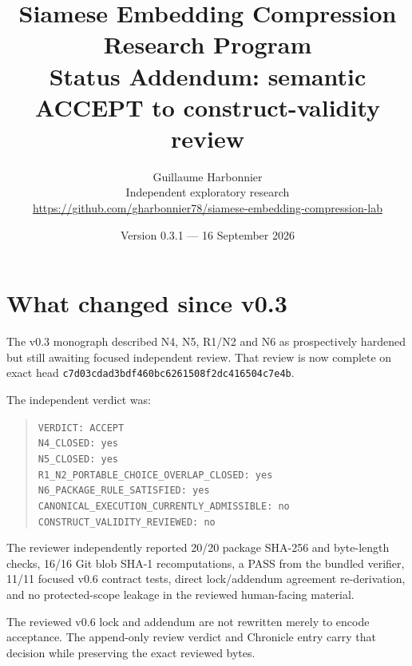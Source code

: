 \documentclass[10pt,a4paper]{article}
\title{\textbf{Siamese Embedding Compression Research Program}\\[4pt]
\large Status Addendum: semantic ACCEPT to construct-validity review}
\author{Guillaume Harbonnier\\
\small Independent exploratory research\\
\small \url{https://github.com/gharbonnier78/siamese-embedding-compression-lab}}
\date{Version 0.3.1 --- 16 September 2026}
\newcommand{\code}[1]{\texttt{#1}}
\begin{document}
\maketitle
\thispagestyle{empty}

\begin{center}
\end{center}

\section{What changed since v0.3}

The v0.3 monograph described N4, N5, R1/N2 and N6 as prospectively hardened but still awaiting focused independent
review. That review is now complete on exact head
\code{c7d03cdad3bdf460bc6261508f2dc416504c7e4b}.

The independent verdict was:

\begin{quote}
\code{VERDICT: ACCEPT}\\
\code{N4\_CLOSED: yes}\\
\code{N5\_CLOSED: yes}\\
\code{R1\_N2\_PORTABLE\_CHOICE\_OVERLAP\_CLOSED: yes}\\
\code{N6\_PACKAGE\_RULE\_SATISFIED: yes}\\
\code{CANONICAL\_EXECUTION\_CURRENTLY\_ADMISSIBLE: no}\\
\code{CONSTRUCT\_VALIDITY\_REVIEWED: no}
\end{quote}

The reviewer independently reported 20/20 package SHA-256 and byte-length checks, 16/16 Git blob SHA-1 recomputations,
a PASS from the bundled verifier, 11/11 focused v0.6 contract tests, direct lock/addendum agreement re-derivation, and
no protected-scope leakage in the reviewed human-facing material.

The reviewed v0.6 lock and addendum are not rewritten merely to encode acceptance. The append-only review verdict and
Chronicle entry carry that decision while preserving the exact reviewed bytes.
\end{document}
